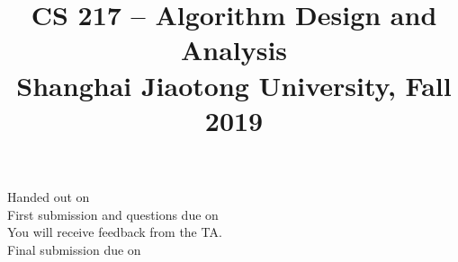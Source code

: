


\usepackage{graphicx,amsmath,amssymb, boxedminipage}



\usepackage{algpseudocode}


\newtheorem{theorem}{Theorem}%
\newtheorem{proposition}[theorem]{Proposition}
\newtheorem{lemma}[theorem]{Lemma}
\newtheorem{corollary}[theorem]{Corollary}
\newtheorem{definition}[theorem]{Definition}



\newcommand{\scalar}[2]{\ensuremath{\langle #1, #2\rangle}}
\newcommand{\floor}[1]{\left\lfloor #1 \right\rfloor}
\newcommand{\ceil}[1]{\left\lceil #1 \right\rceil}
\newcommand{\norm}[1]{\|#1\|}
\newcommand{\pfrac}[2]{\left(\frac{#1}{#2}\right)}
\newcommand{\nth}[1]{#1\textsuperscript{th}}

\newcommand{\E}{\mathop{\mathbb{E\/}}}
\newcommand{\N}{\mathbb{N}}

\newcommand{\R}{\mathbb{R}}

\newtheorem{exercise}[theorem]{Exercise}
\newtheorem{exerciseD}[theorem]{*Exercise}
\newtheorem{exerciseDD}[theorem]{**Exercise}

\let\oldexercise\exercise
\renewcommand{\exercise}{\oldexercise\normalfont}

\let\oldexerciseD\exerciseD
\renewcommand{\exerciseD}{\oldexerciseD\normalfont}

\let\oldexerciseDD\exerciseDD
\renewcommand{\exerciseDD}{\oldexerciseDD\normalfont}


 


\date{}

\title{CS 217 -- Algorithm Design and Analysis \\ 
  \vspace{3mm}
{\large	Shanghai Jiaotong University, Fall 2019\\
}
}
\maketitle

\noindent
Handed out on \handoutdate{}\\
First submission and questions due on \firstduedate{}\\
You will receive feedback from the TA.\\
Final submission due on \finalduedate{}
